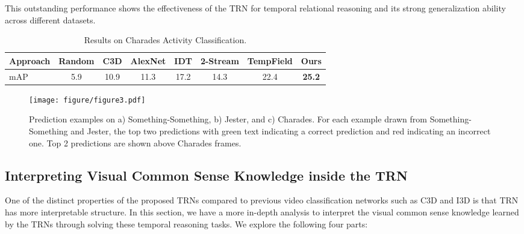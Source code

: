 \documentclass[runningheads]{llncs}
\begin{document}
This outstanding performance shows the effectiveness of the TRN for temporal relational reasoning and its strong generalization ability across different datasets.

\begin{table}
\vspace{-10mm}
\caption{Results on Charades Activity Classification.}
\label{test_charades}
\centering
\begin{tabular}{ l  c  c  c  c  c c c}
\toprule
Approach & Random & C3D & AlexNet & IDT & 2-Stream & TempField & Ours\\
\hline
mAP & 5.9 & 10.9 & 11.3 & 17.2 & 14.3 & 22.4 & \textbf{25.2} \\
\bottomrule
\end{tabular}
\vspace{-5mm}
\end{table}



\begin{figure*}
\vspace{-10mm}
\centering
\texttt{[image: figure/figure3.pdf]}
\vspace{-5mm}
\caption{Prediction examples on a) Something-Something, b) Jester, and c)  Charades. For each example drawn from Something-Something and Jester, the top two predictions with green text indicating a correct prediction and red indicating an incorrect one. Top 2 predictions are shown above Charades frames.}
\vspace{-10mm}
\label{samples_prediction}
\end{figure*}

\subsection{Interpreting Visual Common Sense Knowledge inside the TRN}

One of the distinct properties of the proposed TRNs compared to previous video classification networks such as C3D \cite{tran2015learning} and I3D \cite{carreira2017quo} is that TRN has more interpretable structure. In this section, we have a more in-depth analysis to interpret the visual common sense knowledge learned by the TRNs through solving these temporal reasoning tasks. We explore the following four parts:
\end{document}

